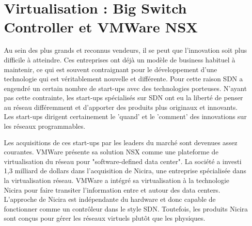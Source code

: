 \section{Virtualisation : Big Switch Controller et VMWare NSX}

Au sein des plus grands et reconnus vendeurs, il se peut que l'innovation soit plus difficile à atteindre. Ces entreprises ont déjà un modèle de business habituel à maintenir, ce qui est souvent contraignant pour le développement d'une technologie qui est véritablement nouvelle et différente. Pour cette raison SDN a engendré un certain nombre de start-ups avec des technologies porteuses. N'ayant pas cette contrainte, les start-ups spécialisés sur SDN ont eu la liberté de penser au réseau différemment et d'apporter des produits plus originaux et innovants. Les start-ups dirigent certainement le 'quand' et le 'comment' des innovations sur les réseaux programmables. \cite{startupsSDN}





Les acquisitions de ces start-ups par les leaders du marché sont devenues assez courantes. VMWare présente sa solution NSX comme une plateforme de virtualisation du réseau pour "software-defined data center". La société a investi 1,3 milliard de dollars dans l'acquisition de Nicira, une entreprise spécialisée dans la virtualisation réseau.
VMWare a intégré sa virtualisation à la technologie Nicira pour faire transiter l'information entre et autour des data centers. L'approche de Nicira est indépendante du hardware et donc capable de fonctionner comme un contrôleur dans le style SDN. Toutefois, les produits Nicira sont conçus pour gérer les réseaux virtuels plutôt que les physiques. \cite{ExecutiveGuideToSDNBigSwitch}


